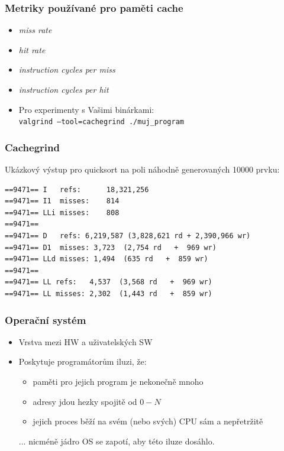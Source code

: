\documentclass[professionalfonts,svgnames]{beamer}
\begin{document}
 \begin{frame}
\frametitle{Metriky používané pro paměti cache}
\begin{itemize}
\item \textit{miss rate}
\item \textit{hit rate}
\item \textit{instruction cycles per miss}
\item \textit{instruction cycles per hit}
\item Pro experimenty s Vašimi binárkami:\\ \texttt{valgrind --tool=cachegrind ./muj\_program}
\end{itemize}
\end{frame}

\begin{frame}[fragile]
\frametitle{Cachegrind}
Ukázkový výstup pro quicksort na poli náhodně generovaných 10000 prvku:
\begin{verbatim}
==9471== I   refs:      18,321,256
==9471== I1  misses:    814
==9471== LLi misses:    808
==9471== 
==9471== D   refs: 6,219,587 (3,828,621 rd + 2,390,966 wr)
==9471== D1  misses: 3,723  (2,754 rd   +  969 wr)
==9471== LLd misses: 1,494  (635 rd   +  859 wr)
==9471== 
==9471== LL refs:   4,537  (3,568 rd   +  969 wr)
==9471== LL misses: 2,302  (1,443 rd   +  859 wr)
\end{verbatim}
\end{frame}

 \begin{frame}
\frametitle{Operační systém}
\begin{itemize}
\item Vrstva mezi HW a uživatelských SW
\item Poskytuje programátorům iluzi, že:
	\begin{itemize}
		\item paměti pro jejich program je nekonečně mnoho
		\item adresy jdou hezky spojitě od $0-N$
		\item jejich proces běží na svém (nebo svých) CPU sám a nepřetržitě
	\end{itemize}
... nicméně jádro OS se zapotí, aby této iluze dosáhlo.
\end{itemize}
\end{frame}
\end{document}
